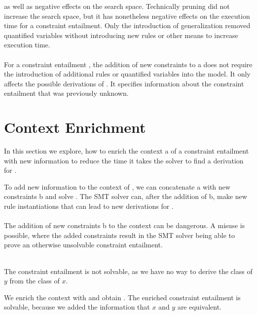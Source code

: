 as well as negative effects on the search space.
Technically pruning did not increase the search space,
but it has nonetheless negative effects on the execution time
for a constraint entailment.
Only the introduction of generalization removed quantified variables
without introducing new rules or other means to increase execution time.\\
\\
For a constraint entailment ,
the addition of new constraints to \ovl a
does not require the introduction of
additional rules or quantified variables into the model.
It only affects the possible derivations of .
It specifies information about the constraint entailment
that was previously unknown.
\newpage

\section{Context Enrichment}
\label{sec:enrichment}
In this section we explore,
how to enrich the context \ovl a
of a constraint entailment 
with new information to reduce
the time it takes the solver to find a derivation for .

To add new information to the context of ,
we can concatenate \ovl a with new constraints \ovl b
and solve .
The SMT solver can, after the addition of \ovl b,
make new rule instantiations that
can lead to new derivations for .\\
\\
The addition of new constraints \ovl b to the context
can be dangerous.
A misuse is possible, where the added constraints
result in the SMT solver being able to
prove an otherwise unsolvable constraint entailment.

\begin{example}
\label{ex:enrich-context-misuse}\quad\\
The constraint entailment 
is not solvable,
as we have no way to derive the class of $y$ from the class of $x$.

We enrich the context with  and obtain
.
The enriched constraint entailment is solvable,
because we added the information that $x$ and $y$ are equivalent.
\end{example}

